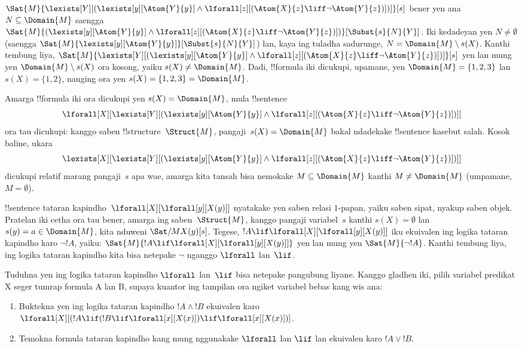 \documentclass[../../../include/open-logic-section]{subfiles}
\begin{document}
\begin{ex}
  $\Sat{M}{\lexists[Y][(\lexists[y][\Atom{Y}{y}] \land
  \lforall[z][(\Atom{X}{z} \liff \lnot \Atom{Y}{z})])]}[s]$
  bener yen ana $N \subseteq \Domain{M}$ saengga
  $\Sat{M}{(\lexists[y][\Atom{Y}{y}] \land \lforall[z][(\Atom{X}{z}
  \liff \lnot \Atom{Y}{z})])}[\Subst{s}{N}{Y}]$. Iki kedadeyan
  yen $N \neq \emptyset$ (saengga
  $\Sat{M}{\lexists[y][\Atom{Y}{y}]}[\Subst{s}{N}{Y}]$) lan,
  kaya ing tuladha sadurunge, $N = \Domain{M} \setminus s(X)$.
  Kanthi tembung liya,
  $\Sat{M}{\lexists[Y][(\lexists[y][\Atom{Y}{y}] \land
  \lforall[z][(\Atom{X}{z} \liff \lnot \Atom{Y}{z})])]}[s]$
  yen lan mung yen $\Domain{M} \setminus s(X)$ ora kosong,
  yaiku $s(X) \neq \Domain{M}$. Dadi, !!{formula} iki
  dicukupi, upamane, yen $\Domain{M} = \{1, 2, 3\}$
  lan $s(X) = \{1, 2\}$, nanging ora yen
  $s(X) = \{1, 2, 3\} = \Domain{M}$.

  Amarga !!{formula} iki ora dicukupi yen
  $s(X) = \Domain{M}$, mula !!{sentence}
  \[
  \lforall[X][\lexists[Y][(\lexists[y][\Atom{Y}{y}] \land
      \lforall[z][(\Atom{X}{z} \liff \lnot \Atom{Y}{z})])]]
  \]
  ora tau dicukupi: kanggo saben !!{structure}~$\Struct{M}$,
  pangaji~$s(X) = \Domain{M}$ bakal ndadekake !!{sentence}
  kasebut salah. Kosok baline, ukara
  \[
  \lexists[X][\lexists[Y][(\lexists[y][\Atom{Y}{y}] \land
      \lforall[z][(\Atom{X}{z} \liff \lnot \Atom{Y}{z})])]]
  \]
  dicukupi relatif marang pangaji~$s$ apa wae, amarga kita
  tansah bisa nemokake $M \subseteq \Domain{M}$ kanthi
  $M \neq \Domain{M}$ (umpamane, $M = \emptyset$).
\end{ex}

\begin{ex}
  !!{sentence} tataran kapindho~$\lforall[X][\lforall[y][X(y)]]$
  nyatakake yen saben relasi $1$-papan, yaiku saben sipat,
  nyakup saben objek. Pratelan iki cetha ora tau bener,
  amarga ing saben~$\Struct{M}$, kanggo pangaji variabel~$s$
  kanthi $s(X) = \emptyset$ lan $s(y) = a \in \Domain{M}$,
  kita nduweni $\Sat/{M}{X(y)}[s]$. Tegese,
  $!A \lif \lforall[X][\lforall[y][X(y)]]$ iku ekuivalen
  ing logika tataran kapindho karo $\lnot !A$, yaiku:
  $\Sat{M}{!A \lif \lforall[X][\lforall[y][X(y)]]}$
  yen lan mung yen $\Sat{M}{\lnot !A}$. Kanthi tembung
  liya, ing logika tataran kapindho kita bisa netepake $\lnot$
  nganggo $\lforall$ lan~$\lif$.
\end{ex}

\begin{prob}
  Tuduhna yen ing logika tataran kapindho $\lforall$ lan~$\lif$
  bisa netepake pangubung liyane. Kanggo gladhen iki, pilih variabel predikat X seger tumrap formula A lan B, supaya kuantor ing tampilan ora ngiket variabel bebas kang wis ana:
  \begin{enumerate}
    \item Buktekna yen ing logika tataran kapindho $!A \land !B$
    ekuivalen karo $\lforall[X][(!A \lif (!B \lif \lforall[x][X(x)])\lif
    \lforall[x][X(x)])]$.
    \item Temokna formula tataran kapindho kang mung nggunakake
    $\lforall$ lan $\lif$ lan ekuivalen karo $!A \lor !B$.
  \end{enumerate}
\end{prob}
\end{document}
